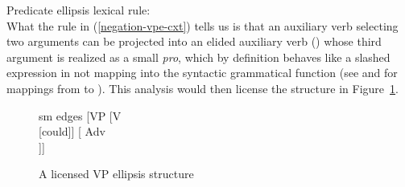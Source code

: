 \documentclass[output=paper
 	        ,biblatex
                ,babelshorthands
                ,newtxmath
                ,draftmode
                ,colorlinks, citecolor=brown
]{langscibook}
\begin{document}
\begin{exe}
\begin{xlist}
\begin{exe}
\begin{xlist}
\ea
\label{negation-vpe-cxt}
Predicate ellipsis lexical rule:\\
\z
%
%
What the rule in (\ref{negation-vpe-cxt}) tells us is that an auxiliary verb selecting two arguments
can be projected into an elided auxiliary verb () whose third
argument is realized as a small \emph{pro}, which by definition
behaves like a slashed expression in not mapping into the syntactic grammatical
 function \comps (see  and  for mappings from
 \argst to \comps). 
This analysis would then license
the structure in Figure~\ref{negation-could-not}.
%
%
%
%
\begin{figure}
	\begin{forest}
		sm edges
		[VP
			[V\\
					[could]]
			[ Adv\\
					[not]]]
	\end{forest}
\caption{A licensed VP ellipsis structure}\label{negation-could-not}
\end{figure}


\end{xlist}
\end{exe}
\end{xlist}
\end{exe}
\end{document}
